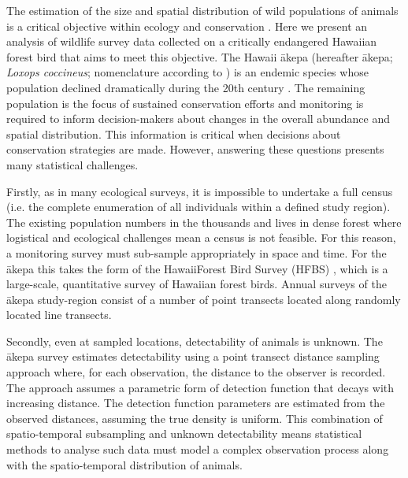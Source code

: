 \documentclass[preprint,12pt]{elsarticle}
\newcommand{\akepa}{\textquotesingle\={a}kepa}  %
\newcommand{\hawaii}{Hawai\textquotesingle i}   %
\begin{document}
The estimation of the size and spatial distribution of wild populations of animals is a critical objective within ecology and conservation \citep{schwarz_estimating_1999}. Here we present an analysis of wildlife survey data collected on a critically endangered Hawaiian forest bird that aims to meet this objective.  The \hawaii{} \akepa{} (hereafter \akepa{}; \textit{Loxops coccineus}; nomenclature according to \citealp{usfws_akepa_1970}) is an endemic species whose population declined dramatically during the 20th century  \citep{usfws_revised_2006, judge_akepa_2018}.  The remaining population is the focus of sustained conservation efforts and monitoring is required to inform decision-makers about changes in the overall abundance and spatial distribution.  This information is critical when decisions about conservation strategies are made.  However, answering these questions presents many statistical challenges.  

Firstly, as in many ecological surveys, it is impossible to undertake a full census (i.e. the complete enumeration of all individuals within a defined study region).  The existing population numbers in the thousands and lives in dense forest where logistical and ecological challenges mean a census is not feasible.  For this reason, a monitoring survey must sub-sample appropriately in space and time.  For the \akepa{} this takes the form of the \hawaii Forest Bird Survey (HFBS) \citep{scott_HFBS_1986}, which is a large-scale, quantitative survey of Hawaiian forest birds.  Annual surveys of the \akepa{} study-region consist of a number of point transects located along randomly located line transects.    

Secondly, even at sampled locations, detectability of animals is unknown.  The \akepa{} survey estimates detectability using a point transect distance sampling approach \citep{buckland_distance_2015} where, for each observation, the distance to the observer is recorded.  The approach assumes a parametric form of detection function that decays with increasing distance.  The detection function parameters are estimated from the observed distances, assuming the true density is uniform. This combination of spatio-temporal subsampling and unknown detectability means statistical methods to analyse such data must model a complex observation process along with the spatio-temporal distribution of animals.  
\end{document}
